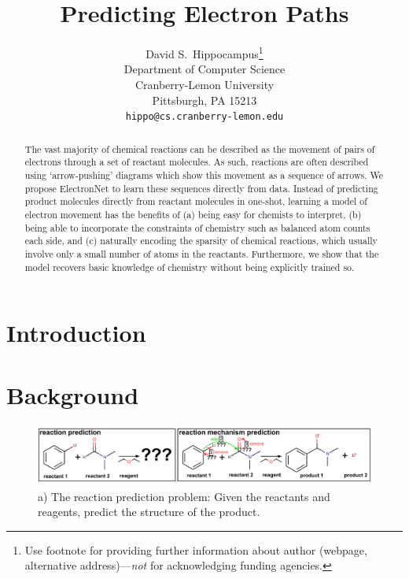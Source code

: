 \documentclass{article}
\title{Predicting Electron Paths}
\author{
  David S.~Hippocampus\thanks{Use footnote for providing further
    information about author (webpage, alternative
    address)---\emph{not} for acknowledging funding agencies.} \\
  Department of Computer Science\\
  Cranberry-Lemon University\\
  Pittsburgh, PA 15213 \\
  \texttt{hippo@cs.cranberry-lemon.edu} \\
}
\begin{document}

\maketitle

\begin{abstract}
The vast majority of chemical reactions can be described as the movement of pairs of electrons through a set of reactant molecules. 
As such, reactions are often described using `arrow-pushing' diagrams which show this movement as a sequence of arrows. 
We propose ElectronNet to learn these sequences directly from data.
Instead of predicting product molecules directly from reactant molecules in one-shot, learning a model of electron movement has the benefits of 
(a) being easy for chemists to interpret, 
(b) being able to incorporate the constraints of chemistry such as balanced atom counts each side, and 
(c) naturally encoding the sparsity of chemical reactions, which usually involve only a small number of atoms in the reactants.
Furthermore, we show that the model recovers basic knowledge of chemistry without being explicitly trained so.
\end{abstract}


\section{Introduction}




\section{Background}




\begin{figure}
\centering
\includegraphics[width=\textwidth]{reaction_diagram}
\caption{a) The reaction prediction problem: Given the reactants and reagents, predict the structure of the product.}
\end{figure}


\end{document}
